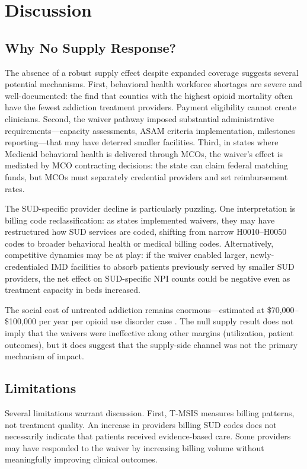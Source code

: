 \documentclass[12pt]{article}
\begin{document}
\section{Discussion}

\subsection{Why No Supply Response?}

The absence of a robust supply effect despite expanded coverage suggests several potential mechanisms. First, behavioral health workforce shortages are severe and well-documented: the \citet{haffajee2019characteristics} find that counties with the highest opioid mortality often have the fewest addiction treatment providers. Payment eligibility cannot create clinicians. Second, the waiver pathway imposed substantial administrative requirements---capacity assessments, ASAM criteria implementation, milestones reporting---that may have deterred smaller facilities. Third, in states where Medicaid behavioral health is delivered through MCOs, the waiver's effect is mediated by MCO contracting decisions: the state can claim federal matching funds, but MCOs must separately credential providers and set reimbursement rates.

The SUD-specific provider decline is particularly puzzling. One interpretation is billing code reclassification: as states implemented waivers, they may have restructured how SUD services are coded, shifting from narrow H0010--H0050 codes to broader behavioral health or medical billing codes. Alternatively, competitive dynamics may be at play: if the waiver enabled larger, newly-credentialed IMD facilities to absorb patients previously served by smaller SUD providers, the net effect on SUD-specific NPI counts could be negative even as treatment capacity in beds increased.

The social cost of untreated addiction remains enormous---estimated at \$70,000--\$100,000 per year per opioid use disorder case \citep{florence2021economic}. The null supply result does not imply that the waivers were ineffective along other margins (utilization, patient outcomes), but it does suggest that the supply-side channel was not the primary mechanism of impact.

\subsection{Limitations}

Several limitations warrant discussion. First, T-MSIS measures billing patterns, not treatment quality. An increase in providers billing SUD codes does not necessarily indicate that patients received evidence-based care. Some providers may have responded to the waiver by increasing billing volume without meaningfully improving clinical outcomes.
\end{document}
